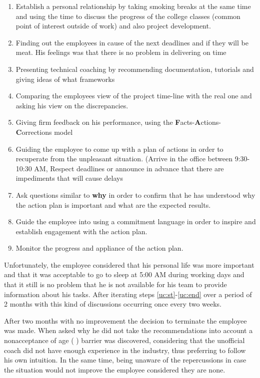 \begin{enumerate}
\item Establish a personal relationship by taking smoking breaks at the same time and using the time to discuss the progress of the college classes (common point of interest outside of work) and also project development.
\item Finding out the employees in cause of the next deadlines and if they will be meat. His feelings was that there is no problem in delivering on time
\item\label{uc:st} Presenting technical coaching by recommending documentation, tutorials and giving ideas of what frameworks 
\item Comparing the employees view of the project time-line with the real one and asking his view on the discrepancies.
\item Giving firm feedback on his performance, using the \textbf{F}acts-\textbf{A}ctions-\textbf{C}orrections model \cite{abur-pm}
\item Guiding the employee to come up with a plan of actions in order to recuperate from the unpleasant situation. (Arrive in the office between 9:30-10:30 AM, Respect deadlines or announce in advance that there are impediments that will cause delays
\item Ask questions similar to \textbf{why} in order to confirm that he has understood why the action plan is important and what are the expected results.
\item\label{uc:end} Guide the employee into using a commitment language \cite{notes-to-a-software-team-leader} in order to inspire and establish engagement with the action plan.
\item Monitor the progress and appliance of the action plan.
\end{enumerate}

Unfortunately, the employee considered that his personal life was more important and that it was acceptable to go to sleep at 5:00 AM during working days and that it still is no problem that he is not available for his team to provide information about his tasks. After iterating steps \ref{uc:st}-\ref{uc:end} over a period of 2 months with this kind of discussions occurring once every two weeks.

After two months with no improvement the decision to terminate the employee was made. When asked why he did not take the recommendations into account a nonacceptance of age ( ) barrier was discovered, considering that the unofficial coach did not have enough experience in the industry, thus preferring to follow his own intuition. In the same time, being unaware of the repercussions in case the situation would not improve the employee considered they are none.

